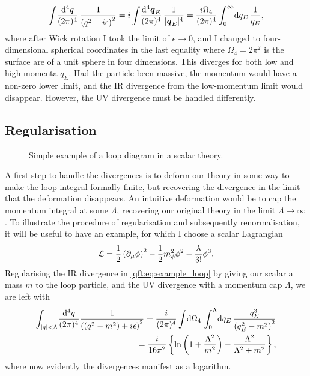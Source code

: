 \documentclass[../main.tex]{subfiles}
\begin{document}
\begin{equation}
  \loopintegral[4]{q} \frac{1}{\pclosed{q^2 + i\epsilon}^2} = i\loopintegral[4]{\vec{q}_E} \frac{1}{|\vec{q}_E|^4} = \frac{i\Omega_4}{(2\pi)^4} \integral[_0^\infty]{q_E} \frac{1}{q_E},
\end{equation}
where after Wick rotation I took the limit of \(\epsilon \to 0\), and I changed to four-dimensional spherical coordinates in the last equality where \(\Omega_4 = 2\pi^2\) is the surface are of a unit sphere in four dimensions.
This diverges for both low and high momenta \(q_E\).
Had the particle been massive, the momentum would have a non-zero lower limit, and the IR divergence from the low-momentum limit would disappear.
However, the UV divergence must be handled differently.



\subsection{Regularisation}

\begin{figure}[!ht]
  \centering
  \caption{Simple example of a loop diagram in a scalar theory.}
  \label{qft:fig:example_loop}
\end{figure}

A first step to handle the divergences is to deform our theory in some way to
make the loop integral formally finite, but recovering the divergence in the
limit that the deformation disappears. An intuitive deformation would be to cap
the momentum integral at some \(\Lambda\), recovering our original theory in
the limit \(\Lambda \to \infty\). To illustrate the procedure of regularisation
and subsequently renormalisation, it will be useful to have an example, for
which I choose a scalar Lagrangian
\begin{equation}
  \label{qft:eq:example_lagrangian}
  \L = \frac{1}{2} \pclosed{\partial_\mu\phi}^2 - \frac{1}{2}m_\phi^2 \phi^2 - \frac{\lambda}{3!} \phi^3.
\end{equation}
Regularising the IR divergence in \cref{qft:eq:example_loop} by giving our scalar a mass \(m\) to the loop particle, and the UV divergence with a momentum cap \(\Lambda\), we are left with
\begin{align}
  \label{qft:eq:cut-off_loop_example}
  \nonumber
  \int_{\abs{q} < \Lambda}\! \frac{\mathrm{d}^4q}{(2\pi)^4}
  \frac{1}{\pclosed{(q^2-m^2)+i\epsilon}^2} = \frac{i}{(2\pi)^4}
  \integral{\Omega_4} \integral[_0^\Lambda]{q_E} \frac{q_E^3}{\pclosed{q_E^2
      -
  m^2}^2} \\
  = \frac{i}{16\pi^2} \cclosed{\ln\pclosed{1 + \frac{\Lambda^2}{m^2}} -
    \frac{\Lambda^2}{\Lambda^2 + m^2}},
\end{align}
where now evidently the divergences manifest as a logarithm.
\medskip
\end{document}
